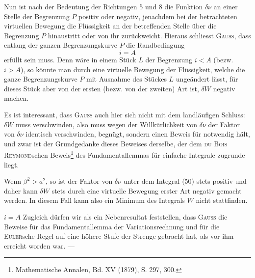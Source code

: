 Nun ist nach der Bedeutung der Richtungen 5 und 8 die Funktion $\delta\nu$
an einer Stelle der Begrenzung $P$ positiv oder negativ, jenachdem bei der
betrachteten virtuellen Bewegung die Flüssigkeit an der betreffenden Stelle
über die Begrenzung $P$ hinaustritt oder von ihr zurückweicht. Hieraus schliesst
\textsc{Gauss}, dass entlang der ganzen Begrenzungskurve $P$ die Randbedingung
\begin{equation*}
i=A\tag{52}
\end{equation*}
erfüllt sein muss. Denn wäre in einem Stück $L$ der Begrenzung $i<A$
(bezw. $i>A$), so könnte man durch eine virtuelle Bewegung der Flüssigkeit,
\clearpage{}
\noindent welche die ganze Begrenzungskurve $P$ mit Ausnahme des Stückes $L$ ungeändert
lässt, für dieses Stück aber von der ersten (bezw. von der zweiten) Art
ist, $\delta W$ negativ machen.

Es ist interessant, dass \textsc{Gauss} auch hier sich nicht mit dem landläufigen
Schluss: $\delta W$ muss verschwinden, also muss wegen der Willkürlichkeit von $\delta\nu$
der Faktor von $\delta\nu$ identisch verschwinden, begnügt, sondern einen Beweis für
notwendig hält, und zwar ist der Grundgedanke dieses Beweises derselbe, der
dem \textsc{du Bois Reymond}schen Beweis\footnote{Mathematische Annalen, Bd. XV (1879), S. 297, 300.} des Fundamentallemmas für einfache
Integrale zugrunde liegt.

Wenn $\beta^2>a^2$, so ist der Faktor von $\delta\nu$ unter dem Integral (50) stets
positiv und daher kann $\delta W$ stets durch eine virtuelle Bewegung erster Art
negativ gemacht werden. In diesem Fall kann also ein Minimum des Integrals
$W$ nicht stattfinden.

 $i=A$ 
Zugleich dürfen wir
als ein Nebenresultat feststellen, dass \textsc{Gauss} die Beweise für das Fundamentallemma
der Variationsrechnung und für die \textsc{Euler}sche Regel auf eine höhere
Stufe der Strenge gebracht hat, als vor ihm erreicht worden war. —
\par\clearpage\endgroup
